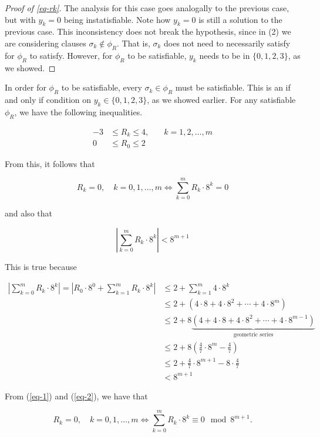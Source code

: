 \documentclass{amsart}
\theoremstyle{plain}
\begin{document}
\begin{proof}[Proof of \autoref{eq-rk}]
  The analysis for this case goes analogally to the previous case, but with $y_k=0$ being
  instatisfiable. Note how $y_k=0$ is still a solution to the previous case. This inconsistency
  does not break the hypothesis, since in (2) we are considering clauses $\sigma_k\not\in\phi_R$.
  That is, $\sigma_k$ does not need to necessarily satisfy for $\phi_R$ to satisfy. However, for
  $\phi_R$ to be satisfiable, $y_k$ needs to be in $\{0,1,2,3\}$, as we showed.
\end{proof}

In order for $\phi_R$ to be satisfiable, every $\sigma_k\in\phi_R$ must be satisfiable. This is an
if and only if condition on $y_k\in\{0,1,2,3\}$, as we showed earlier. For any satisfiable
$\phi_R$, we have the following inequalities.

\begin{align*}
  -3&\leq R_k\leq 4, \quad &k=1,2,\ldots,m\\
  0&\leq R_0\leq 2
\end{align*}

From this, it follows that

\begin{equation}\label{eq-1}
  R_k=0, \quad k=0,1,\ldots,m \iff \sum_{k=0}^m R_k\cdot 8^k = 0
\end{equation}

and also that

\begin{equation}\label{eq-2}
  \left| \sum_{k=0}^m R_k\cdot 8^k \right| < 8^{m+1}
\end{equation}

This is true because

\begin{align*}
  \left|\sum_{k=0}^m R_k\cdot 8^k\right|=\left|R_0\cdot 8^0+\sum_{k=1}^m R_k\cdot 8^k\right|&\leq
    2+\sum_{k=1}^m 4\cdot 8^k\\
    &\leq 2+(4\cdot 8+4\cdot 8^2+\cdots+4\cdot 8^m)\\
    &\leq2+8\underbrace{(4+4\cdot 8+4\cdot 8^2+\cdots+4\cdot 8^{m-1})}_{\text{geometric series}}\\
    &\leq 2+ 8\left(\frac{4}{7}\cdot 8^m-\frac{4}{7}\right)\\
    &\leq 2+\frac{4}{7}\cdot 8^{m+1} -8\cdot\frac{4}{7}\\
    &< 8^{m+1}
\end{align*}

From (\ref{eq-1}) and (\ref{eq-2}), we have that

\begin{equation}\label{eq-3}
  R_k=0,\quad k=0,1,\ldots,m \iff \sum_{k=0}^m R_k\cdot 8^k\equiv 0\mod 8^{m+1}.
\end{equation}
\end{document}
